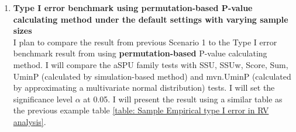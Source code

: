 \documentclass[12pt]{article}
\begin{document}
\begin{enumerate}
\item \textbf{Type I error benchmark using permutation-based P-value calculating method under the default settings with varying sample sizes}\\
I plan to compare the result from previous Scenario 1 to the Type I error benchmark result from using \textbf{permutation-based} P-value calculating method. %
I will compare the aSPU family tests with SSU, SSUw, Score, Sum, UminP (calculated by simulation-based method) and mvn.UminP (calculated by approximating a multivariate normal distribution) tests. I will set the significance level $\alpha$ at 0.05. I will present the result using a similar table as the previous example table \ref{table: Sample Empirical type I error in RV analysis}.
%
% 

\end{enumerate}
\end{document}
